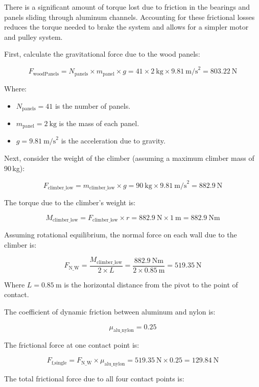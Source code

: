There is a significant amount of torque lost due to friction in the bearings and panels sliding through aluminum channels. Accounting for these frictional losses reduces the torque needed to brake the system and allows for a simpler motor and pulley system.

First, calculate the gravitational force due to the wood panels:

\[
F_{\text{woodPanels}} = N_{\text{panels}} \times m_{\text{panel}} \times g = 41 \times 2\ \text{kg} \times 9.81\ \text{m/s}^2 = 803.22\ \text{N}
\]

Where:
\begin{itemize}
    \item \( N_{\text{panels}} = 41 \) is the number of panels.
    \item \( m_{\text{panel}} = 2\ \text{kg} \) is the mass of each panel.
    \item \( g = 9.81\ \text{m/s}^2 \) is the acceleration due to gravity.
\end{itemize}

Next, consider the weight of the climber (assuming a maximum climber mass of 90\,kg):

\[
F_{\text{climber\_low}} = m_{\text{climber\_low}} \times g = 90\ \text{kg} \times 9.81\ \text{m/s}^2 = 882.9\ \text{N}
\]

The torque due to the climber's weight is:

\[
M_{\text{climber\_low}} = F_{\text{climber\_low}} \times r = 882.9\ \text{N} \times 1\ \text{m} = 882.9\ \text{Nm}
\]

Assuming rotational equilibrium, the normal force on each wall due to the climber is:

\[
F_{\text{N\_W}} = \frac{M_{\text{climber\_low}}}{2 \times L} = \frac{882.9\ \text{Nm}}{2 \times 0.85\ \text{m}} = 519.35\ \text{N}
\]

Where \( L = 0.85\ \text{m} \) is the horizontal distance from the pivot to the point of contact.

The coefficient of dynamic friction between aluminum and nylon is:

\[
\mu_{\text{alu\_nylon}} = 0.25
\]

The frictional force at one contact point is:

\[
F_{\text{f,single}} = F_{\text{N\_W}} \times \mu_{\text{alu\_nylon}} = 519.35\ \text{N} \times 0.25 = 129.84\ \text{N}
\]

The total frictional force due to all four contact points is:

